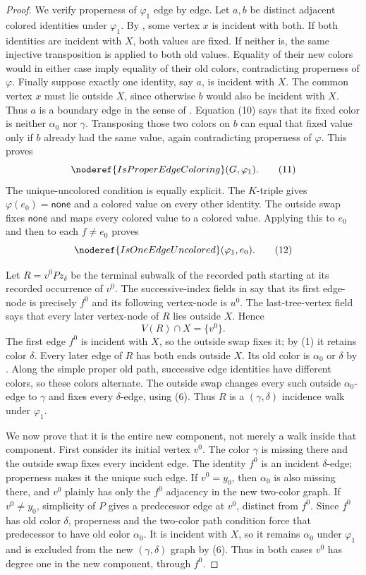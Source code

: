 \begin{proof}
We verify properness of $\varphi_1$ edge by edge.  Let $a,b$ be distinct
adjacent colored identities under $\varphi_1$.  By
, some vertex $x$ is incident with both.  If both
identities are incident with $X$, both values are fixed.  If neither is,
the same injective transposition is applied to both old values.  Equality
of their new colors would in either case imply equality of their old
colors, contradicting properness of $\varphi$.  Finally suppose exactly
one identity, say $a$, is incident with $X$.  The common vertex $x$ must
lie outside $X$, since otherwise $b$ would also be incident with $X$.
Thus $a$ is a boundary edge in the sense of .
Equation (10) says that its fixed color is neither $\alpha_0$ nor
$\gamma$.  Transposing those two colors on $b$ can equal that fixed value
only if $b$ already had the same value, again contradicting properness of
$\varphi$.  This proves
\[
 \noderef{IsProperEdgeColoring}(G,\varphi_1).                  \tag{11}
\]
The unique-uncolored condition is equally explicit.  The $K$-triple gives
$\varphi(e_0)=\mathsf{none}$ and a colored value on every other identity.
The outside swap fixes $\mathsf{none}$ and maps every colored value to a
colored value.  Applying this to $e_0$ and then to each $f\ne e_0$ proves
\[
 \noderef{IsOneEdgeUncolored}(\varphi_1,e_0).                  \tag{12}
\]

Let $R=v^0Pz_\delta$ be the terminal subwalk of the recorded path starting
at its recorded occurrence of $v^0$.  The successive-index fields in
 say that its first edge-node is precisely
$f^0$ and its following vertex-node is $u^0$.  The last-tree-vertex field
says that every later vertex-node of $R$ lies outside $X$.  Hence
\[
 V(R)\cap X=\{v^0\}.                                         \tag{13}
\]
The first edge $f^0$ is incident with $X$, so the outside swap fixes it;
by (1) it retains color $\delta$.  Every later edge of $R$ has both ends
outside $X$.  Its old color is $\alpha_0$ or $\delta$ by
.  Along the simple proper old path,
successive edge identities have different colors, so these colors
alternate.  The outside swap changes every such outside
$\alpha_0$-edge to $\gamma$ and fixes every $\delta$-edge, using (6).
Thus $R$ is a $(\gamma,\delta)$ incidence walk under $\varphi_1$.

We now prove that it is the entire new component, not merely a walk inside
that component.  First consider its initial vertex $v^0$.  The color
$\gamma$ is missing there and the outside swap fixes every incident edge.
The identity $f^0$ is an incident $\delta$-edge; properness makes it the
unique such edge.  If $v^0=y_0$, then $\alpha_0$ is also missing there,
and $v^0$ plainly has only the $f^0$ adjacency in the new two-color graph.
If $v^0\ne y_0$, simplicity of $P$ gives a predecessor edge at $v^0$,
distinct from $f^0$.  Since $f^0$ has old color $\delta$, properness and
the two-color path condition force that predecessor to have old color
$\alpha_0$.  It is incident with $X$, so it remains $\alpha_0$ under
$\varphi_1$ and is excluded from the new $(\gamma,\delta)$ graph by (6).
Thus in both cases $v^0$ has degree one in the new component, through
$f^0$.


\end{proof}
